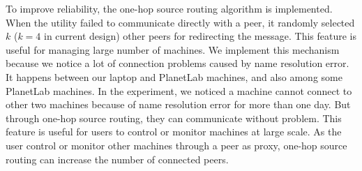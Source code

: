 To improve reliability, the one-hop source
routing\cite{Gummadi2004} algorithm is implemented. When the
utility failed to communicate directly with a peer, it
randomly selected $k$ ($k=4$ in current design) other peers
for redirecting the message.  This feature is useful for
managing large number of machines. We implement this mechanism
because we notice a lot of connection problems caused by
name resolution error. It happens between our laptop and
PlanetLab machines, and also among some PlanetLab machines.  In
the experiment, we noticed a machine cannot connect to other
two machines because of name resolution error for more than one
day.  But through one-hop source routing, they can
communicate without problem. This feature is useful for
users to control or monitor machines at large scale. As the
user control or monitor other machines through a peer as proxy,
one-hop source routing can increase the number of connected
peers.

